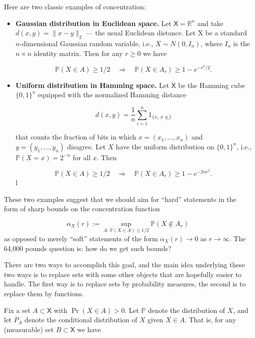 \documentclass[12pt, oneside, a4paper]{article}
\theoremstyle{plain}
\theoremstyle{definition}
\begin{document}
Here are two classic examples of concentration:
\begin{itemize}
    \item \textbf{Gaussian distribution in Euclidean space.}
 Let $\mathsf{X} = \mathbb{R}^n$ and take $d(x,y) = \| x - y \|_2$ — the usual Euclidean distance. Let {X} be a standard $n$-dimensional Gaussian random variable, i.e., $X \sim N(0,I_n)$, where $I_n$ is the $n\times n$ identity matrix. Then for any $r \ge 0$ we have

    \begin{equation*} {\mathbb P}(X \in A) \ge 1/2 \quad \Longrightarrow \quad {\mathbb P}(X \in A_r) \ge 1 - e^{-r^2/2}. \end{equation*}
    \item \textbf{Uniform distribution in Hamming space.}
 Let $\mathsf{X}$ be the Hamming cube ${\{0,1\}^n}$ equipped with the normalized Hamming distance

    \begin{equation*} d(x,y) = \frac{1}{n}\sum^n_{i=1}1_{\{x_i \neq y_i\}} \end{equation*}

    that counts the fraction of bits in which $x = (x_1,\ldots,x_n)$ and 
$y = (y_1,\ldots,y_n)$ disagree. Let $X$ have the uniform distribution on $\{0,1\}^n$, i.e., 
$\mathbb{P}(X=x) = 2^{-n}$ for all $x$. Then

\begin{equation*} \mathbb{P}(X \in A) \ge 1/2 \quad \Longrightarrow \quad \mathbb{P}(X \in A_r) \ge 
1 - e^{-2nr^2}.\end{equation*}l
\end{itemize}
These two examples suggest that we should aim for 
“hard” statements in the form of sharp bounds on the concentration function

\begin{equation*}\alpha_X(r) := \sup_{A:\, {\mathbb P}(X \in A) \ge 1/2} {\mathbb P}(X \not\in A_r) \end{equation*}
as opposed to merely “soft” statements of the form $\alpha_X(r) \rightarrow 0$ as $r \rightarrow \infty$. The 64,000 pounds question is: how do we get such bounds?

There are two ways to accomplish this goal, and the main idea underlying these two ways is to replace sets with some other objects that are hopefully 
easier to handle. The first way is to replace sets by probability measures, the second is to replace them by functions. 

Fix a set $A \subset \mathsf{X}$ with $\Pr(X \in A) > 0$. Let $\mathbb{P}$ denote the distribution of $X$, and let 
$P_A$ denote the conditional distribution of $X$ given $X \in A$. That is, for any (measurable) set $B \subset \mathsf{X}$ we have
\end{document}
